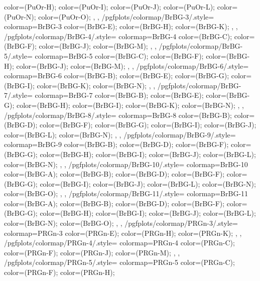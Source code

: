 {{{      color=(PuOr-H);
      color=(PuOr-I);
      color=(PuOr-J);
      color=(PuOr-L);
      color=(PuOr-N);
      color=(PuOr-O);
    },
  },
  /pgfplots/colormap/BrBG-3/.style={
    colormap={BrBG-3}{
      color=(BrBG-E);
      color=(BrBG-H);
      color=(BrBG-K);
    },
  },
  /pgfplots/colormap/BrBG-4/.style={
    colormap={BrBG-4}{
      color=(BrBG-C);
      color=(BrBG-F);
      color=(BrBG-J);
      color=(BrBG-M);
    },
  },
  /pgfplots/colormap/BrBG-5/.style={
    colormap={BrBG-5}{
      color=(BrBG-C);
      color=(BrBG-F);
      color=(BrBG-H);
      color=(BrBG-J);
      color=(BrBG-M);
    },
  },
  /pgfplots/colormap/BrBG-6/.style={
    colormap={BrBG-6}{
      color=(BrBG-B);
      color=(BrBG-E);
      color=(BrBG-G);
      color=(BrBG-I);
      color=(BrBG-K);
      color=(BrBG-N);
    },
  },
  /pgfplots/colormap/BrBG-7/.style={
    colormap={BrBG-7}{
      color=(BrBG-B);
      color=(BrBG-E);
      color=(BrBG-G);
      color=(BrBG-H);
      color=(BrBG-I);
      color=(BrBG-K);
      color=(BrBG-N);
    },
  },
  /pgfplots/colormap/BrBG-8/.style={
    colormap={BrBG-8}{
      color=(BrBG-B);
      color=(BrBG-D);
      color=(BrBG-F);
      color=(BrBG-G);
      color=(BrBG-I);
      color=(BrBG-J);
      color=(BrBG-L);
      color=(BrBG-N);
    },
  },
  /pgfplots/colormap/BrBG-9/.style={
    colormap={BrBG-9}{
      color=(BrBG-B);
      color=(BrBG-D);
      color=(BrBG-F);
      color=(BrBG-G);
      color=(BrBG-H);
      color=(BrBG-I);
      color=(BrBG-J);
      color=(BrBG-L);
      color=(BrBG-N);
    },
  },
  /pgfplots/colormap/BrBG-10/.style={
    colormap={BrBG-10}{
      color=(BrBG-A);
      color=(BrBG-B);
      color=(BrBG-D);
      color=(BrBG-F);
      color=(BrBG-G);
      color=(BrBG-I);
      color=(BrBG-J);
      color=(BrBG-L);
      color=(BrBG-N);
      color=(BrBG-O);
    },
  },
  /pgfplots/colormap/BrBG-11/.style={
    colormap={BrBG-11}{
      color=(BrBG-A);
      color=(BrBG-B);
      color=(BrBG-D);
      color=(BrBG-F);
      color=(BrBG-G);
      color=(BrBG-H);
      color=(BrBG-I);
      color=(BrBG-J);
      color=(BrBG-L);
      color=(BrBG-N);
      color=(BrBG-O);
    },
  },
  /pgfplots/colormap/PRGn-3/.style={
    colormap={PRGn-3}{
      color=(PRGn-E);
      color=(PRGn-H);
      color=(PRGn-K);
    },
  },
  /pgfplots/colormap/PRGn-4/.style={
    colormap={PRGn-4}{
      color=(PRGn-C);
      color=(PRGn-F);
      color=(PRGn-J);
      color=(PRGn-M);
    },
  },
  /pgfplots/colormap/PRGn-5/.style={
    colormap={PRGn-5}{
      color=(PRGn-C);
      color=(PRGn-F);
      color=(PRGn-H);
}}}
